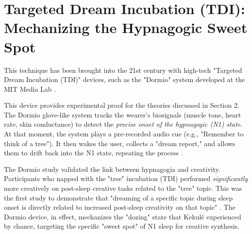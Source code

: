 \section{Targeted Dream Incubation (TDI): Mechanizing the Hypnagogic Sweet Spot}\label{sec:tdi}

This technique has been brought into the 21st century with high-tech "Targeted Dream Incubation (TDI)" devices, such as the "Dormio" system developed at the MIT Media Lab \citep{haarhorowitz2020dormio}.

This device provides experimental proof for the theories discussed in Section 2. The Dormio glove-like system tracks the wearer's biosignals (muscle tone, heart rate, skin conductance) to detect the \textit{precise onset of the hypnagogic (N1) state}. At that moment, the system plays a pre-recorded audio cue (e.g., "Remember to think of a tree"). It then wakes the user, collects a "dream report," and allows them to drift back into the N1 state, repeating the process \citep{haarhorowitz2020dormio}.

The Dormio study validated the link between hypnagogia and creativity. Participants who napped with the "tree" incubation (TDI) performed \textit{significantly} more creatively on post-sleep creative tasks related to the "tree" topic. This was the first study to demonstrate that "dreaming of a specific topic during sleep onset is directly related to increased post-sleep creativity on that topic" \citep{haarhorowitz2020dormio}. The Dormio device, in effect, mechanizes the "dozing" state that Kekulé experienced by chance, targeting the specific "sweet spot" of N1 sleep for creative synthesis.
